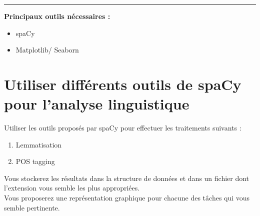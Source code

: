 \newcommand{\numTD}{TD1}
\newcommand{\themeTD}{Analyse en caractères}
\newcommand{\file}{toto.tex}



\hrule

\noindent{}
\newline


\textbf{Principaux outils nécessaires :}
\begin{itemize}
  \item spaCy
  \item Matplotlib/ Seaborn

  
\end{itemize}

\section{Utiliser différents outils de spaCy pour l'analyse linguistique}
Utiliser les outils proposés par spaCy pour effectuer les traitements suivants :
\begin{enumerate}
\item Lemmatisation
\item POS tagging
\end{enumerate}
 Vous stockerez les résultats dans la structure de données et dans un fichier dont l'extension vous semble les plus appropriées.\\
 
 Vous proposerez une représentation graphique pour chacune des tâches qui vous semble pertinente.\\

